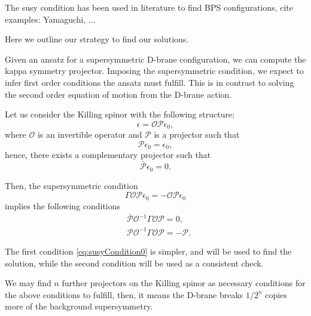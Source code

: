The susy condition has been used in literature to find BPS configurations, cite examples: Yamaguchi, ...

Here we outline our strategy to find our solutions.

Given an ansatz for a supersymmetric D-brane configuration, we can compute the kappa symmetry projector. 
Imposing the supersymmetric condition, we expect to infer first order conditions the ansatz must fulfill. 
This is in contrast to solving the second order equation of motion from the D-brane action.


Let us consider the Killing spinor with the following structure:
\begin{equation}
\epsilon = \mathcal{O} \mathcal{P} \epsilon_0,
\end{equation}
where $\mathcal{O}$ is an invertible operator and $\mathcal{P}$ is a projector such that
\begin{equation}
    \mathcal{P} \epsilon_0 =  \epsilon_0,
\end{equation}
hence, there exists a complementary projector such that 
\begin{equation}
    \bar{\mathcal{P}} \epsilon_0 =  0.
\end{equation}

Then, the supersymmetric condition
\begin{equation}
 \Gamma \mathcal{O} \mathcal{P} \epsilon_0 = - \mathcal{O} \mathcal{P} \epsilon_0
\end{equation}
implies the following conditions
\begin{align}\label{eq:susyCondition0}
&\bar{\mathcal{P}} \mathcal{O}^{-1} \Gamma \mathcal{O} \mathcal{P}  = 0, \\
&\mathcal{P} \mathcal{O}^{-1} \Gamma \mathcal{O} \mathcal{P} = -\mathcal{P}.
\end{align}

The first condition \eqref{eq:susyCondition0} is simpler, and will be used to find the solution, while the second condition will be used as a consistent check.

We may find $n$ further projectors on the Killing spinor as necessary conditions for the above conditions to fulfill, then, it means the D-brane breaks $1/2^n$ copies more of the background supersymmetry. 

























